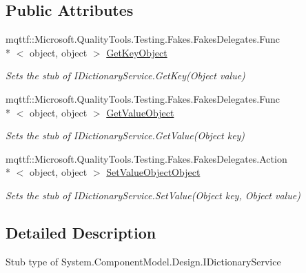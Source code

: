 \subsection*{Public Attributes}
\begin{DoxyCompactItemize}
\item 
mqttf\-::\-Microsoft.\-Quality\-Tools.\-Testing.\-Fakes.\-Fakes\-Delegates.\-Func\\*
$<$ object, object $>$ \hyperlink{class_system_1_1_component_model_1_1_design_1_1_fakes_1_1_stub_i_dictionary_service_a0596013d6f43debd8f63cb8ddd8f7025}{Get\-Key\-Object}
\begin{DoxyCompactList}\small\item\em Sets the stub of I\-Dictionary\-Service.\-Get\-Key(\-Object value)\end{DoxyCompactList}\item 
mqttf\-::\-Microsoft.\-Quality\-Tools.\-Testing.\-Fakes.\-Fakes\-Delegates.\-Func\\*
$<$ object, object $>$ \hyperlink{class_system_1_1_component_model_1_1_design_1_1_fakes_1_1_stub_i_dictionary_service_a7facfe071b117242e59e1b7bf2fbca2e}{Get\-Value\-Object}
\begin{DoxyCompactList}\small\item\em Sets the stub of I\-Dictionary\-Service.\-Get\-Value(\-Object key)\end{DoxyCompactList}\item 
mqttf\-::\-Microsoft.\-Quality\-Tools.\-Testing.\-Fakes.\-Fakes\-Delegates.\-Action\\*
$<$ object, object $>$ \hyperlink{class_system_1_1_component_model_1_1_design_1_1_fakes_1_1_stub_i_dictionary_service_a07b24a19abfbef8129cf3e052e2e799e}{Set\-Value\-Object\-Object}
\begin{DoxyCompactList}\small\item\em Sets the stub of I\-Dictionary\-Service.\-Set\-Value(\-Object key, Object value)\end{DoxyCompactList}\end{DoxyCompactItemize}


\subsection{Detailed Description}
Stub type of System.\-Component\-Model.\-Design.\-I\-Dictionary\-Service



